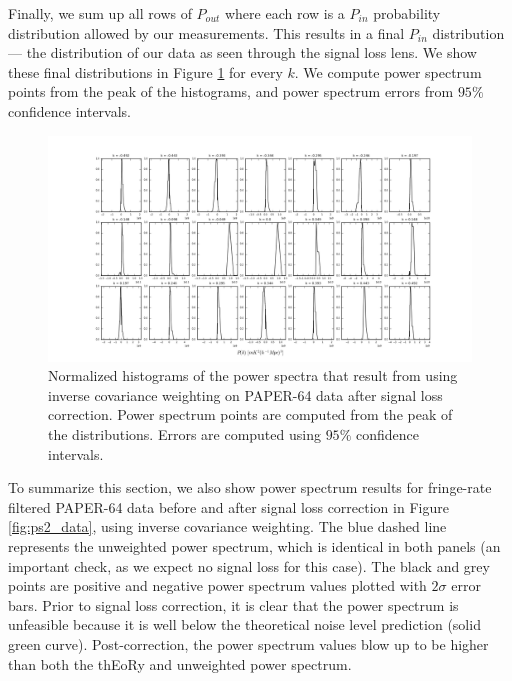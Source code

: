 \documentclass[preprint2,numberedappendix,tighten]{aastex6}  %
\begin{document}
Finally, we sum up all rows of $P_{out}$ where each row is a $P_{in}$ probability distribution allowed by our measurements. This results in a final $P_{in}$ distribution --- the distribution of our data as seen through the signal loss lens. We show these final distributions in Figure \ref{fig:sigloss_datadist_inversecovariance} for every $k$. We compute power spectrum points from the peak of the histograms, and power spectrum errors from $95\%$ confidence intervals. 

\begin{figure}
	\centering
	\includegraphics[trim={1cm 0cm 1cm 1cm},width=1\textwidth]{plots/sigloss_datadist_inversecovariance.png}
	\caption{Normalized histograms of the power spectra that result from using inverse covariance weighting on PAPER-64 data after signal loss correction. Power spectrum points are computed from the peak of the distributions. Errors are computed using $95\%$ confidence intervals.}
	\label{fig:sigloss_datadist_inversecovariance}
\end{figure}

To summarize this section, we also show power spectrum results for fringe-rate filtered PAPER-64 data before and after signal loss correction in Figure \ref{fig:ps2_data}, using inverse covariance weighting. The blue dashed line represents the unweighted power spectrum, which is identical in both panels (an important check, as we expect no signal loss for this case). The black and grey points are positive and negative power spectrum values plotted with $2\sigma$ error bars. Prior to signal loss correction, it is clear that the power spectrum is unfeasible because it is well below the theoretical noise level prediction (solid green curve). Post-correction, the power spectrum values blow up to be higher than both the thEoRy and unweighted power spectrum. 
\end{document}
